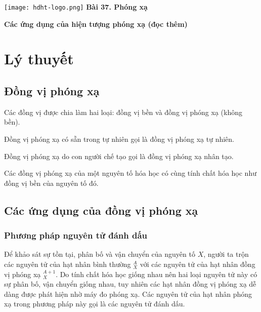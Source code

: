 \newcommand{\chapter}[2][]{
	\newcommand{\chapname}{#2}
	\begin{flushleft}
		\begin{minipage}[t]{\linewidth}
			\texttt{[image: hdht-logo.png]}
			\hspace{0pt}	
			\sffamily\bfseries\large Bài  37. Phóng xạ
			\begin{flushleft}
				\huge\bfseries #1
			\end{flushleft}
		\end{minipage}
	\end{flushleft}
	\vspace{1cm}
	\normalfont\normalsize
}
\chapter[Các ứng dụng của hiện tượng phóng xạ (đọc thêm)]{Các ứng dụng của hiện tượng phóng xạ (đọc thêm)}
\section{Lý thuyết}

\subsection{Đồng vị phóng xạ}
	Các đồng vị được chia làm hai loại: đồng vị bền và đồng vị phóng xạ (không bền).
	
	Đồng vị phóng xạ có sẵn trong tự nhiên gọi là đồng vị phóng xạ tự nhiên.
	
	Đồng vị phóng xạ do con người chế tạo gọi là đồng vị phóng xạ nhân tạo.
	
	Các đồng vị phóng xạ của một nguyên tố hóa học có cùng tính chất hóa học như đồng vị bền của nguyên tố đó.
\subsection{Các ứng dụng của đồng vị phóng xạ}

\subsubsection{Phương pháp nguyên tử đánh dấu}
	Để khảo sát sự tồn tại, phân bố và vận chuyển của nguyên tố $X$, người ta trộn các nguyên tử của hạt nhân bình thường $^A_X$ với các nguyên tử của hạt nhân đồng vị phóng xạ $^{A+1}_X$. Do tính chất hóa học giống nhau nên hai loại nguyên tử này có sự phân bố, vận chuyển giống nhau, tuy nhiên các hạt nhân đồng vị phóng xạ dễ dàng được phát hiện nhờ máy đo phóng xạ. Các nguyên tử của hạt nhân phóng xạ trong phương pháp này gọi là các nguyên tử đánh dấu. 
	
